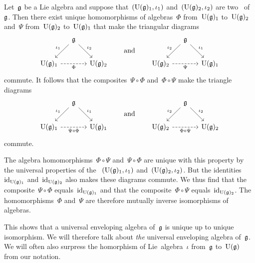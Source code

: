 \begin{remark}
	\label{uniqueness of universal enveloping algebras}
	Let~$\mathfrak{g}$ be a Lie algebra and suppose that~$(\operatorname{U}(\mathfrak{g})_1, \iota_1)$ and~$(\operatorname{U}(\mathfrak{g})_2, \iota_2)$ are two~{\uas} of~$\mathfrak{g}$.
	Then there exist unique homomorphisms of algebras~$\Phi$ from~$\operatorname{U}(\mathfrak{g})_1$ to~$\operatorname{U}(\mathfrak{g})_2$ and~$\Psi$ from~$\operatorname{U}(\mathfrak{g})_2$ to~$\operatorname{U}(\mathfrak{g})_1$ that make the triangular diagrams
	\[
		\begin{tikzcd}[column sep = small]
			{}
			&
			\glie
			\arrow{dl}[above left]{\iota_1}
			\arrow{dr}[above right]{\iota_2}
			&
			{}
			\\
			\Univ(\glie)_1
			\arrow[dashed]{rr}[below]{\Phi}
			&
			{}
			&
			\Univ(\glie)_2
		\end{tikzcd}
		\qquad\text{and}\qquad
		\begin{tikzcd}[column sep = small]
			{}
			&
			\glie
			\arrow{dl}[above left]{\iota_2}
			\arrow{dr}[above right]{\iota_1}
			&
			{}
			\\
			\Univ(\glie)_2
			\arrow[dashed]{rr}[below]{\Psi}
			&
			{}
			&
			\Univ(\glie)_1
		\end{tikzcd}
	\]
	commute.
	It follows that the composites~$\Psi \circ \Phi$ and~$\Phi \circ \Psi$ make the triangle diagrams
	\[
		\begin{tikzcd}[column sep = small]
			{}
			&
			\glie
			\arrow{dl}[above left]{\iota_1}
			\arrow{dr}[above right]{\iota_1}
			&
			{}
			\\
			\Univ(\glie)_1
			\arrow[dashed]{rr}[below]{\Psi \circ \Phi}
			&
			{}
			&
			\Univ(\glie)_1
		\end{tikzcd}
		\qquad\text{and}\qquad
		\begin{tikzcd}[column sep = small]
			{}
			&
			\glie
			\arrow{dl}[above left]{\iota_2}
			\arrow{dr}[above right]{\iota_2}
			&
			{}
			\\
			\Univ(\glie)_2
			\arrow[dashed]{rr}[below]{\Phi \circ \Psi}
			&
			{}
			&
			\Univ(\glie)_2
		\end{tikzcd}
	\]
	commute.

	The algebra homomorphisms~$\Phi \circ \Psi$ and~$\Psi \circ \Phi$ are unique with this property by the universal properties of the {\uas}~$(\operatorname{U}(\mathfrak{g})_1, \iota_1)$ and~$(\operatorname{U}(\mathfrak{g})_2, \iota_2)$.
	But the identities~$\mathrm{id}_{\operatorname{U}(\mathfrak{g})_1}$ and~$\mathrm{id}_{\operatorname{U}(\mathfrak{g})_2}$ also makes these diagrams commute.
	We thus find that the composite~$\Psi \circ \Phi$ equals~$\mathrm{id}_{\operatorname{U}(\mathfrak{g})_1}$ and that the composite~$\Phi \circ \Psi$ equals~$\mathrm{id}_{\operatorname{U}(\mathfrak{g})_2}$.
	The homomorphisms~$\Phi$ and~$\Psi$ are therefore mutually inverse isomorphisms of algebras.
	
	This shows that a universal enveloping algebra of~$\mathfrak{g}$ is unique up to unique isomorphism.
	We will therefore talk about \emph{the} universal enveloping algebra of~$\mathfrak{g}$.
	We will often also surpress the homorphism of Lie~algebra~$\iota$ from~$\mathfrak{g}$ to~$\operatorname{U}(\mathfrak{g})$ from our notation.
\end{remark}


